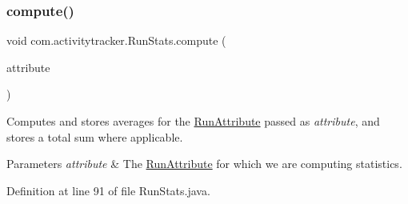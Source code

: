 \subsubsection{\texorpdfstring{compute()}{compute()}}
{\footnotesize\ttfamily void com.\+activitytracker.\+Run\+Stats.\+compute (\begin{DoxyParamCaption}\item[{final \mbox{\hyperlink{enumcom_1_1activitytracker_1_1_run_attribute}{Run\+Attribute}}}]{attribute }\end{DoxyParamCaption})\hspace{0.3cm}{\ttfamily [private]}}

Computes and stores averages for the \mbox{\hyperlink{enumcom_1_1activitytracker_1_1_run_attribute}{Run\+Attribute}} passed as {\itshape attribute}, and stores a total sum where applicable.


\begin{DoxyParams}{Parameters}
{\em attribute} & The \mbox{\hyperlink{enumcom_1_1activitytracker_1_1_run_attribute}{Run\+Attribute}} for which we are computing statistics. \\
\hline
\end{DoxyParams}


Definition at line 91 of file Run\+Stats.\+java.



